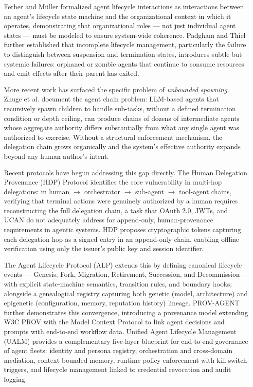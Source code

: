 Ferber and M\"uller \cite{ferber1996} formalized agent lifecycle interactions as interactions between an agent's lifecycle state machine and the organizational context in which it operates, demonstrating that organizational roles --- not just individual agent states --- must be modeled to ensure system-wide coherence. Padgham and Thiel \cite{padgham2001} further established that incomplete lifecycle management, particularly the failure to distinguish between suspension and termination states, introduces subtle but systemic failures: orphaned or zombie agents that continue to consume resources and emit effects after their parent has exited.

More recent work has surfaced the specific problem of \emph{unbounded spawning}. Zhuge et al. \cite{zhuge2024} document the agent chain problem: LLM-based agents that recursively spawn children to handle sub-tasks, without a defined termination condition or depth ceiling, can produce chains of dozens of intermediate agents whose aggregate authority differs substantially from what any single agent was authorized to exercise. Without a structural enforcement mechanism, the delegation chain grows organically and the system's effective authority expands beyond any human author's intent.

Recent protocols have begun addressing this gap directly. The Human Delegation Provenance (HDP) Protocol \cite{hdp-draft,hdp-draft-2} identifies the core vulnerability in multi-hop delegations: in human $\rightarrow$ orchestrator $\rightarrow$ sub-agent $\rightarrow$ tool-agent chains, verifying that terminal actions were genuinely authorized by a human requires reconstructing the full delegation chain, a task that OAuth 2.0, JWTs, and UCAN do not adequately address for append-only, human-provenance requirements in agentic systems. HDP proposes cryptographic tokens capturing each delegation hop as a signed entry in an append-only chain, enabling offline verification using only the issuer's public key and session identifier.

The Agent Lifecycle Protocol (ALP) \cite{alp2025} extends this by defining canonical lifecycle events --- Genesis, Fork, Migration, Retirement, Succession, and Decommission --- with explicit state-machine semantics, transition rules, and boundary hooks, alongside a genealogical registry capturing both genetic (model, architecture) and epigenetic (configuration, memory, reputation history) lineage. PROV-AGENT \cite{prov-agent2025} further demonstrates this convergence, introducing a provenance model extending W3C PROV \cite{prov-standard} with the Model Context Protocol to link agent decisions and prompts with end-to-end workflow data. Unified Agent Lifecycle Management (UALM) \cite{ualm2025} provides a complementary five-layer blueprint for end-to-end governance of agent fleets: identity and persona registry, orchestration and cross-domain mediation, context-bounded memory, runtime policy enforcement with kill-switch triggers, and lifecycle management linked to credential revocation and audit logging.

